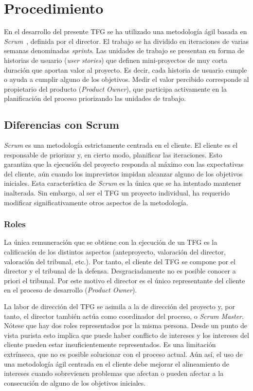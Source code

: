 \chapter{Procedimiento}
\label{ch:procedimiento}


En el desarrollo del presente TFG se ha utilizado una metodología ágil basada en \emph{Scrum}~\cite{scrumguide}, definida por el director. El trabajo se ha dividido en iteraciones de varias semanas denominadas \emph{sprints}. Las unidades de trabajo se presentan en forma de historias de usuario (\emph{user stories}) que definen mini-proyectos de muy corta duración que aportan valor al proyecto.  Es decir, cada historia de usuario cumple o ayuda a cumplir alguno de los objetivos. Medir el valor percibido corresponde al propietario del producto (\emph{Product Owner}), que participa activamente en la planificación del proceso priorizando las unidades de trabajo.

\section{Diferencias con Scrum}
\emph{Scrum} es una metodología estrictamente centrada en el cliente. El cliente es el responsable de priorizar y, en cierto modo, planificar las iteraciones. Esto garantiza que la ejecución del proyecto responda al máximo con las expectativas del cliente, aún cuando los imprevistos impidan alcanzar alguno de los objetivos iniciales. Esta característica de \emph{Scrum} es la única que se ha intentado mantener inalterada. Sin embargo, al ser el TFG un proyecto individual, ha requerido modificar significativamente otros aspectos de la metodología.

\subsection{Roles}
La única remuneración que se obtiene con la ejecución de un TFG es la calificación de los distintos aspectos (anteproyecto, valoración del director, valoración del tribunal, etc.). Por tanto, el cliente del TFG se compone por el director y el tribunal de la defensa. Desgraciadamente no es posible conocer a priori el tribunal. Por este motivo el director es el único representante del cliente en el proceso de desarrollo (\emph{Product Owner}).

La labor de dirección del TFG se asimila a la de dirección del proyecto y, por tanto, el director también actúa como coordinador del proceso, o \emph{Scrum Master}. Nótese que hay dos roles representados por la misma persona. Desde un punto de vista purista esto implica que puede haber conflicto de intereses y los intereses del cliente pueden estar insuficientemente representados. Es una limitación extrínseca, que no es posible solucionar con el proceso actual. Aún así, el uso de una metodología ágil centrada en el cliente debe mejorar el alineamiento de intereses cuando sobrevienen problemas que afectan o pueden afectar a la consecución de alguno de los objetivos iniciales.

